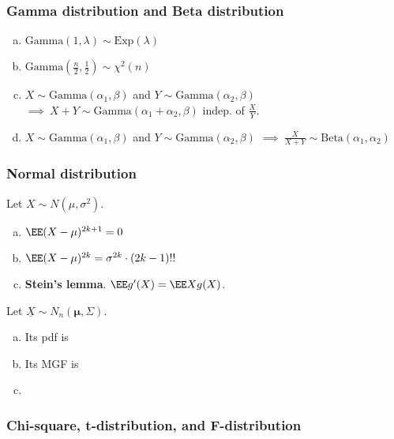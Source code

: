 \subsubsection{Gamma distribution and Beta distribution}
\begin{prop}\textbf{ } 
	\begin{enumerate}[a)]
		\item $\mathrm{Gamma}(1,\lambda) \sim \mathrm{Exp}(\lambda)$
		\item $\mathrm{Gamma}(\frac{n}{2},\frac{1}{2}) \sim \chi^2(n)$
		\item $X \sim \mathrm{Gamma}(\alpha_1, \beta)$ and $Y \sim \mathrm{Gamma}(\alpha_2, \beta)$  $\implies \ X+Y \sim \mathrm{Gamma}(\alpha_1 + \alpha_2, \beta)$ indep. of $\frac{X}{Y}$.
		\item $X \sim \mathrm{Gamma}(\alpha_1, \beta)$ and $Y \sim \mathrm{Gamma}(\alpha_2, \beta)$  $\implies \ \frac{X}{X+Y} \sim \mathrm{Beta}(\alpha_1 , \alpha_2)$
	\end{enumerate}
\end{prop}

\subsubsection{Normal distribution}
\begin{prop}Let $X \sim N(\mu, \sigma^2)$.
	\begin{enumerate}[a)]
		\item $\EE( X -\mu)^{2k+1} = 0$
		\item $\EE( X - \mu )^{2k} = \sigma^{2k} \cdot (2k-1)!!$
		\item \textbf{Stein's lemma}. $\EE g'(X) = \EE Xg(X)$.
	\end{enumerate}
\end{prop}

\begin{prop}Let $\underline{X} \sim N_n( \boldsymbol{\mu}, \Sigma)$.
	\begin{enumerate}[a)]
		\item Its pdf is 
		$$  $$
		\item Its MGF is  
		$$  $$
		\item 
	\end{enumerate}
\end{prop}

\subsubsection{Chi-square, t-distribution, and F-distribution}

